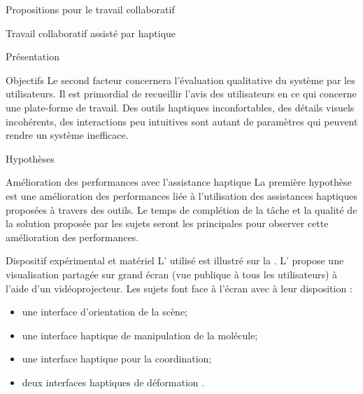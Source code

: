 \documentclass[myfrancais]{mythesis}
\begin{document}
\begin{mypart}{Propositions pour le travail collaboratif}
\begin{mychapter}{Travail collaboratif assisté par haptique}
\begin{mysection}{Présentation}
\begin{mysubsection}{Objectifs}
					Le second facteur concernera l'évaluation qualitative du système par les utilisateurs.
					Il est primordial de recueillir l'avis des utilisateurs en ce qui concerne une plate-forme de travail.
					Des outils haptiques inconfortables, des détails visuels incohérents, des interactions peu intuitives sont autant de paramètres qui peuvent rendre un système inefficace.
				\end{mysubsection}
				\begin{mysubsection}{Hypothèses}
					\begin{myparagraph}{ Amélioration des performances avec l'assistance haptique}
						La première hypothèse est une amélioration des performances liée à l'utilisation des assistances haptiques proposées à travers des outils.
						Le temps de complétion de la tâche et la qualité de la solution proposée par les sujets seront les  principales pour observer cette amélioration des performances.
					\end{myparagraph}
				\end{mysubsection}
			\end{mysection}
			\begin{mysection}{Dispositif expérimental et matériel}
				L' utilisé est illustré sur la .
				L' propose une visualisation partagée sur grand écran (vue publique à tous les utilisateurs) à l'aide d'un vidéoprojecteur.
				Les  sujets font face à l'écran avec à leur disposition :
				\begin{itemize}
					\item une interface d'orientation de la scène;
					\item une interface haptique de manipulation de la molécule;
					\item une interface haptique pour la coordination;
					\item deux interfaces haptiques de déformation .
				\end{itemize}


\end{mysection}
\end{mychapter}
\end{mypart}
\end{document}
